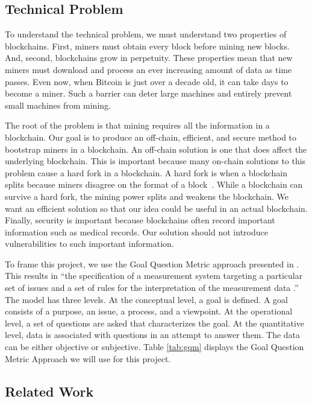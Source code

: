 \subsection{Technical Problem}

To understand the technical problem, we must understand two properties of blockchains.
First, miners must obtain every block before mining new blocks.
And, second, blockchains grow in perpetuity.
These properties mean that new miners must download and process an ever increasing amount of data as time passes.
Even now, when Bitcoin is just over a decade old, it can take days to become a miner. %
Such a barrier can deter large machines and entirely prevent small machines from mining.

The root of the problem is that mining requires all the information in a blockchain.
Our goal is to produce an off-chain, efficient, and secure method to bootstrap miners in a blockchain.
An off-chain solution is one that does affect the underlying blockchain.
This is important because many on-chain solutions to this problem cause a hard fork in a blockchain.
A hard fork is when a blockchain splits because miners disagree on the format of a block~\cite{lin2017Survey}.
While a blockchain can survive a hard fork, the mining power splits and weakens the blockchain.
We want an efficient solution so that our idea could be useful in an actual blockchain.
Finally, security is important because blockchains often record important information such as medical records. 
Our solution should not introduce vulnerabilities to such important information.

To frame this project, we use the Goal Question Metric approach presented in \cite{basili1994goal}.
This results in ``the specification of a measurement system targeting a particular set of issues and a set of rules for the interpretation of the measurement data \cite{basili1994goal}.''
The model has three levels.
At the conceptual level, a goal is defined.
A goal consists of a purpose, an issue, a process, and a viewpoint.
At the operational level, a set of questions are asked that characterizes the goal.
At the quantitative level, data is associated with questions in an attempt to answer them.
The data can be either objective or subjective.
Table \ref{tab:gqm} displays the Goal Question Metric Approach we will use for this project.



\subsection{Related Work}

